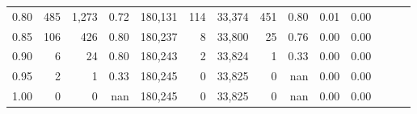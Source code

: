 \begin{tabular}{rrrrrrrrrrrrrr}
0.80 &     485 &  1,273 &  0.72 &  180,131 &      114 &  33,374 &     451 &  0.80 &  0.01 &      0.00 \\
0.85 &     106 &    426 &  0.80 &  180,237 &        8 &  33,800 &      25 &  0.76 &  0.00 &      0.00 \\
0.90 &       6 &     24 &  0.80 &  180,243 &        2 &  33,824 &       1 &  0.33 &  0.00 &      0.00 \\
0.95 &       2 &      1 &  0.33 &  180,245 &        0 &  33,825 &       0 &   nan &  0.00 &      0.00 \\
1.00 &       0 &      0 &   nan &  180,245 &        0 &  33,825 &       0 &   nan &  0.00 &      0.00 \\
\bottomrule
\end{tabular}
